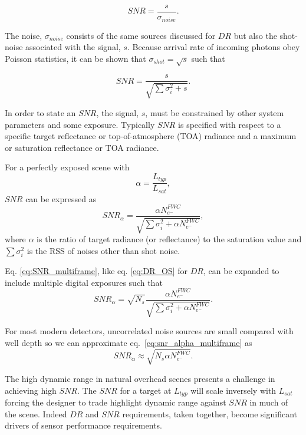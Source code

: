 \documentclass[]{spieman}  %
\begin{document}
\begin{equation*}
    SNR = \frac{s}{\sigma_{noise}}.
\end{equation*}

The noise, $\sigma_{noise}$ consists of the same sources discussed for $DR$ but also the shot-noise associated with the signal, $s$.  Because arrival rate of incoming photons obey Poisson statistics, it can be shown that $\sigma_{shot} = \sqrt{s}$ such that

\begin{equation*}
    SNR = \frac{s}{\sqrt{\sum{\sigma_i^2} + s}}.
\end{equation*}

In order to state an $SNR$, the signal, $s$, must be constrained by other system parameters and some exposure.  Typically $SNR$ is specified with respect to a specific target reflectance or top-of-atmosphere (TOA) radiance and a maximum or saturation reflectance or TOA radiance.  

For a perfectly exposed scene with
\begin{equation}
    \alpha = \frac{L_{typ}}{L_{sat}},
\end{equation}
${SNR}$ can be expressed as
\begin{equation}
    SNR_{\alpha} = \frac{\alpha N_{e^-}^{FWC}}{\sqrt{\sum{\sigma_i^2} + \alpha N_{e^-}^{FWC}}},
\label{eq:SNR_multiframe}
\end{equation}
where $\alpha$ is the ratio of target radiance (or reflectance) to the saturation value and $\sum{\sigma_i^2}$ is the RSS of noises other than shot noise.

Eq. \eqref{eq:SNR_multiframe}, like eq. \eqref{eq:DR_OS} for $DR$, can be expanded to include multiple digital exposures such that
\begin{equation}
\label{eq:snr_alpha_multiframe}
SNR_{\alpha} = \sqrt{N_s}\frac{\alpha N_{e^-}^{FWC}}{\sqrt{\sum{\sigma_i^2} + \alpha N_{e^-}^{FWC}}}.
\end{equation}

For most modern detectors, uncorrelated noise sources are small compared with well depth so we can approximate eq.~\eqref{eq:snr_alpha_multiframe} as
\begin{equation}
\label{eq:snr_alpha_multiframe_simp}
SNR_{\alpha} \approx \sqrt{N_s \alpha N_{e^-}^{FWC}}.
\end{equation}

The high dynamic range in natural overhead scenes presents a challenge in achieving high $SNR$.  The $SNR$ for a target at $L_{typ}$ will scale inversely with $L_{sat}$ forcing the designer to trade highlight dynamic range against $SNR$ in much of the scene.  Indeed $DR$ and $SNR$ requirements, taken together, become significant drivers of sensor performance requirements.
\end{document}
